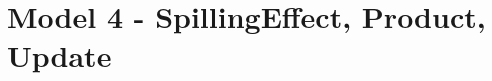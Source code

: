 \documentclass[]{report}
\begin{document}


\chapter{Model 4 - SpillingEffect, Product, Update}
\end{document}
